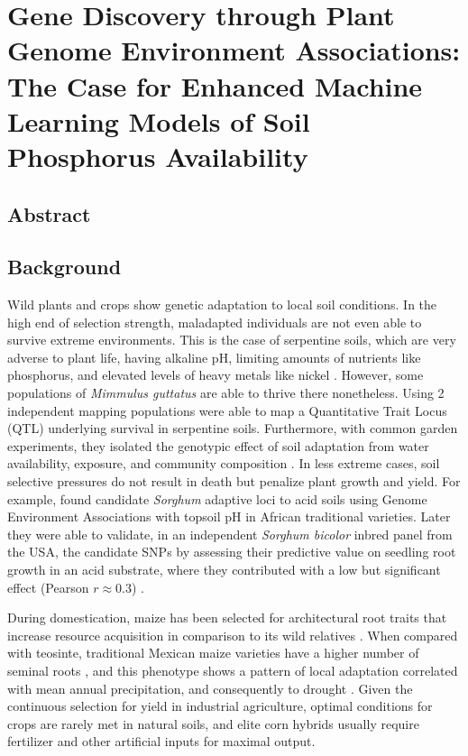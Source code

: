 \chapter{Gene Discovery through Plant Genome Environment Associations:
The Case for Enhanced Machine Learning Models of Soil Phosphorus Availability}
\label{chap-two}

\newrefsection

\section{Abstract}

\section{Background} 

Wild plants and crops show genetic adaptation to local soil conditions. 
In the high end of selection strength, maladapted individuals are not even able to survive extreme environments. 
This is the case of serpentine soils, which are very adverse to plant life, having alkaline pH, limiting amounts of nutrients like phosphorus, and elevated levels of heavy metals like nickel \citep{alexander2006}.
However, some populations of \textit{Mimmulus guttatus} are able to thrive there nonetheless. 
Using 2 independent mapping populations \citep{selby2018} were able to map a Quantitative Trait Locus (QTL) underlying survival in serpentine soils.
Furthermore, with common garden experiments, they isolated the genotypic effect of soil adaptation from water availability, exposure, and community composition \citep{selby2018}.
In less extreme cases, soil selective pressures do not result in death but penalize plant growth and yield.
For example, \citep{lasky2015-ar} found candidate \textit{Sorghum} adaptive loci to acid soils using Genome Environment Associations with topsoil pH in African traditional varieties. 
Later they were able to validate, in an independent \textit{Sorghum bicolor} inbred panel from the USA, the candidate SNPs by assessing their predictive value on seedling root growth in an acid substrate, where they contributed with a low but significant effect (Pearson $r \approx 0.3$) \citep{lasky2015-ar}. 

During domestication, maize has been selected for architectural root traits that increase resource acquisition in comparison to its wild relatives \citep{burton2013a,perkins2021}. When compared with teosinte, traditional Mexican maize varieties have a higher number of seminal roots \citep{burton2013a}, and this phenotype shows a pattern of local adaptation correlated with mean annual precipitation, and consequently to drought \citep{mclaughlin2023}.
Given the continuous selection for yield in industrial agriculture, optimal conditions for crops are rarely met in natural soils, and elite corn hybrids usually require fertilizer and other artificial inputs for maximal output. 

